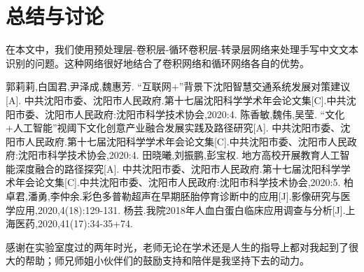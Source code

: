 \documentclass[winfonts]{njuthesis}
\begin{document}
\chapter{总结与讨论}
在本文中，我们使用预处理层-卷积层-循环卷积层-转录层网络来处理手写中文文本识别的问题。这种网络很好地结合了卷积网络和循环网络各自的优势。

%
%

\begin{thebibliography}{99}  

郭莉莉,白国君,尹泽成,魏惠芳. “互联网+”背景下沈阳智慧交通系统发展对策建议[A]. 中共沈阳市委、沈阳市人民政府.第十七届沈阳科学学术年会论文集[C].中共沈阳市委、沈阳市人民政府:沈阳市科学技术协会,2020:4.
陈香敏,魏伟,吴莹. “文化+人工智能”视阈下文化创意产业融合发展实践及路径研究[A]. 中共沈阳市委、沈阳市人民政府.第十七届沈阳科学学术年会论文集[C].中共沈阳市委、沈阳市人民政府:沈阳市科学技术协会,2020:4.
田晓曦,刘振鹏,彭宝权. 地方高校开展教育人工智能深度融合的路径探究[A]. 中共沈阳市委、沈阳市人民政府.第十七届沈阳科学学术年会论文集[C].中共沈阳市委、沈阳市人民政府:沈阳市科学技术协会,2020:5.
柏卓君,潘勇,李仲余.彩色多普勒超声在早期胚胎停育诊断中的应用[J].影像研究与医学应用,2020,4(18):129-131.
杨芸.我院2018年人血白蛋白临床应用调查与分析[J].上海医药,2020,41(17):34-35+74.

\end{thebibliography} 



\begin{acknowledgement}
感谢在实验室度过的两年时光，老师无论在学术还是人生的指导上都对我起到了很大的帮助；师兄师姐小伙伴们的鼓励支持和陪伴是我坚持下去的动力。
\end{acknowledgement}

\end{document}
